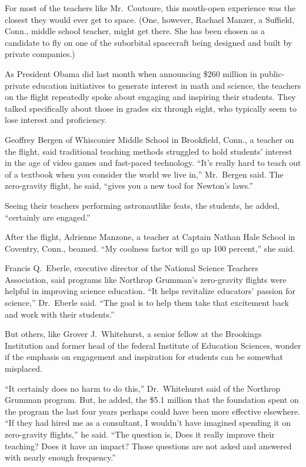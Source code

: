 ﻿\documentclass[12pt]{article}
\begin{document}
For most of the teachers like Mr.~Coutoure, this mouth-open experience was the closest they would
ever get to space. (One, however, Rachael Manzer, a Suffield, Conn., middle school teacher, might
get there. She has been chosen as a candidate to fly on one of the suborbital spacecraft being
designed and built by private companies.)

As President Obama did last month when announcing \$260 million in public-private education
initiatives to generate interest in math and science, the teachers on the flight repeatedly spoke
about engaging and inspiring their students. They talked specifically about those in grades six
through eight, who typically seem to lose interest and proficiency.

Geoffrey Bergen of Whisconier Middle School in Brookfield, Conn., a teacher on the flight, said
traditional teaching methods struggled to hold students' interest in the age of video games and
fast-paced technology. ``It's really hard to teach out of a textbook when you consider the world we
live in,'' Mr.~Bergen said. The zero-gravity flight, he said, ``gives you a new tool for Newton's
laws.''

Seeing their teachers performing astronautlike feats, the students, he added, ``certainly are
engaged.''

After the flight, Adrienne Manzone, a teacher at Captain Nathan Hale School in Coventry, Conn.,
beamed. ``My coolness factor will go up 100 percent,'' she said.

Francis Q.~Eberle, executive director of the National Science Teachers Association, said programs
like Northrop Grumman's zero-gravity flights were helpful in improving science education. ``It helps
revitalize educators' passion for science,'' Dr.~Eberle said. ``The goal is to help them take that
excitement back and work with their students.''

But others, like Grover J.~Whitehurst, a senior fellow at the Brookings Institution and former head
of the federal Institute of Education Sciences, wonder if the emphasis on engagement and inspiration
for students can be somewhat misplaced.

``It certainly does no harm to do this,'' Dr.~Whitehurst said of the Northrop Grumman program. But,
he added, the \$5.1 million that the foundation spent on the program the last four years perhaps
could have been more effective elsewhere. ``If they had hired me as a consultant, I wouldn't have
imagined spending it on zero-gravity flights,'' he said. ``The question is, Does it really improve
their teaching? Does it have an impact? Those questions are not asked and answered with nearly
enough frequency.''
\end{document}
